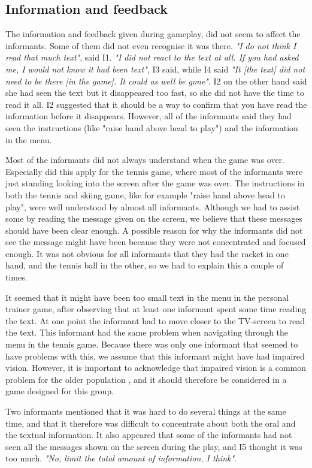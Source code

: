 \subsection{Information and feedback}
The information and feedback given during gameplay, did not seem to affect the informants. Some of them did not even recognise it was there. \emph{"I do not think I read that much text"}, said I1. \emph{"I did not react to the text at all. If you had asked me, I would not know it had been text"}, I3 said, while I4 said \emph{"It [the text] did not need to be there [in the game]. It could as well be gone"}. I2 on the other hand said she had seen the text but it disappeared too fast, so she did not have the time to read it all. I2 suggested that it should be a way to confirm that you have read the information before it disappears. However, all of the informants said they had seen the instructions (like "raise hand above head to play") and the information in the menu. 

Most of the informants did not always understand when the game was over. Especially did this apply for the tennis game, where most of the informants were just standing looking into the screen after the game was over.  The instructions in both the tennis and skiing game, like for example "raise hand above head to play", were well understood by almost all informants. Although we had to assist some by reading the message given on the screen, we believe that these messages should have been clear enough. A possible reason for why the informants did not see the message might have been because they were not concentrated and focused enough. It was not obvious for all informants that they had the racket in one hand, and the tennis ball in the other, so we had to explain this a couple of times. 

It seemed that it might have been too small text in the menu in the personal trainer game, after observing that at least one informant spent some time reading the text. At one point the informant had to move closer to the TV-screen to read the text. This informant had the same problem when navigating through the menu in the tennis game. Because there was only one informant that seemed to have problems with this, we assume that this informant might have had impaired vision. However, it is important to acknowledge that impaired vision is a common problem for the older population  \cite{ijsselsteijn2007digital}, and it should therefore be considered in a game designed for this group. 

Two informants mentioned that it was hard to do several things at the same time, and that it therefore was difficult to concentrate about both the oral and the textual information. It also appeared that some of the informants had not seen all the messages shown on the screen during the play, and I5 thought it was too much. \emph{"No, limit the total amount of information, I think"}. 

